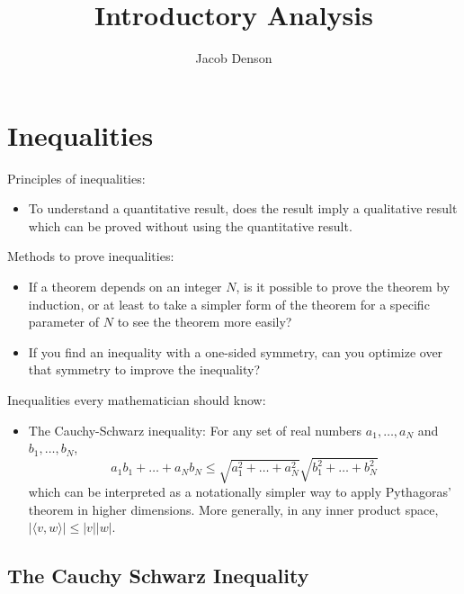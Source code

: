 

\title{Introductory Analysis}
\author{Jacob Denson}



\maketitle
\tableofcontents
{}

\chapter{Inequalities}

Principles of inequalities:

\begin{itemize}
    \item To understand a quantitative result, does the result imply a qualitative result which can be proved without using the quantitative result.
\end{itemize}

Methods to prove inequalities:

\begin{itemize}
    \item If a theorem depends on an integer $N$, is it possible to prove the theorem by induction, or at least to take a simpler form of the theorem for a specific parameter of $N$ to see the theorem more easily?

    \item If you find an inequality with a one-sided symmetry, can you optimize over that symmetry to improve the inequality?
\end{itemize}

Inequalities every mathematician should know:

\begin{itemize}
    \item The Cauchy-Schwarz inequality: For any set of real numbers $a_1, \dots, a_N$ and $b_1, \dots, b_N$,
    \[ a_1b_1 + \dots + a_Nb_N \leq \sqrt{a_1^2 + \dots + a_N^2} \sqrt{b_1^2 + \dots + b_N^2} \]
    which can be interpreted as a notationally simpler way to apply Pythagoras' theorem in higher dimensions. More generally, in any inner product space, $|\langle v, w \rangle| \leq |v| |w|$.
\end{itemize}

\section{The Cauchy Schwarz Inequality}

